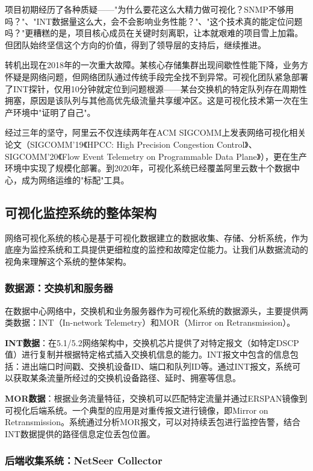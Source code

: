 项目初期经历了各种质疑——"为什么要花这么大精力做可视化？SNMP不够用吗？"、"INT数据量这么大，会不会影响业务性能？"、"这个技术真的能定位问题吗？"更糟糕的是，项目核心成员在关键时刻离职，让本就艰难的项目雪上加霜。但团队始终坚信这个方向的价值，得到了领导层的支持后，继续推进。

转机出现在2018年的一次重大故障。某核心存储集群出现间歇性性能下降，业务方怀疑是网络问题，但网络团队通过传统手段完全找不到异常。可视化团队紧急部署了INT探针，仅用10分钟就定位到问题根源——某台交换机的特定队列存在周期性拥塞，原因是该队列与其他高优先级流量共享缓冲区。这是可视化技术第一次在生产环境中"证明了自己"。

经过三年的坚守，阿里云不仅连续两年在ACM SIGCOMM上发表网络可视化相关论文（SIGCOMM'19《HPCC: High Precision Congestion Control》、SIGCOMM'20《Flow Event Telemetry on Programmable Data Plane》），更在生产环境中实现了规模化部署。到2020年，可视化系统已经覆盖阿里云数十个数据中心，成为网络运维的"标配"工具。

\subsection{可视化监控系统的整体架构}

网络可视化系统的核心是基于可视化数据建立的数据收集、存储、分析系统，作为底座为监控系统和工具提供更细粒度的监控和故障定位能力。让我们从数据流动的视角来理解这个系统的整体架构。

\subsubsection{数据源：交换机和服务器}

在数据中心网络中，交换机和业务服务器作为可视化系统的数据源头，主要提供两类数据：INT（In-network Telemetry）和MOR（Mirror on Retransmission）。

\textbf{INT数据}：在5.1/5.2网络架构中，交换机芯片提供了对特定报文（如特定DSCP值）进行复制并根据特定格式插入交换机信息的能力。INT报文中包含的信息包括：进出端口时间戳、交换机设备ID、端口和队列ID等。通过INT报文，系统可以获取某条流量所经过的交换机设备路径、延时、拥塞等信息。

\textbf{MOR数据}：根据业务流量特征，交换机可以匹配特定流量并通过ERSPAN镜像到可视化后端系统。一个典型的应用是对重传报文进行镜像，即Mirror on Retransmission。系统通过分析MOR报文，可以对持续丢包进行监控告警，结合INT数据提供的路径信息定位丢包位置。

\subsubsection{后端收集系统：NetSeer Collector}


